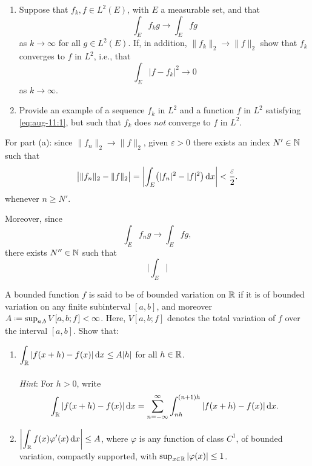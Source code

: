 \begin{problem}
  \hfill
  \begin{enumerate}[label=(\alph*),noitemsep]
  \item Suppose that \(f_k,f\in L^2(E)\), with \(E\) a measurable set, and
    that
    \[
      \label{eq:aug-11:1}
      \tag{\(\bigstar\)}
      \int_E f_kg\longrightarrow\int_E fg
    \]
    as \(k\to\infty\) for all \(g\in L^2(E)\). If, in addition,
    \(\|f_k\|_2\to\|f\|_2\) show that \(f_k\) converges to \(f\) in
    \(L^2\), i.e., that
    \[
      \int_E|f-f_k|^2\longrightarrow 0
    \]
    as \(k\to\infty\).
  \item Provide an example of a sequence \(f_k\) in \(L^2\) and a function
    \(f\) in \(L^2\) satisfying \eqref{eq:aug-11:1}, but such that \(f_k\)
    does \emph{not} converge to \(f\) in \(L^2\).
  \end{enumerate}
\end{problem}
\begin{solution}
  For part (a): since \(\|f_n\|_2\to\|f\|_2\), given \(\varepsilon>0\)
  there exists an index \(N'\in\mathbb{N}\) such that
  \[
    \bigl|
    \|f_n\|_2-\|f\|_2
    \bigr|
    =
    \biggl|
    \int_E\bigl(|f_n|^2-|f|^2\bigr)\mathop{}\!\mathrm{d} x
    \biggr|
    <\frac{\varepsilon}{2}.
  \]
  whenever \(n\geq N'\).

  Moreover, since
  \[
    \int_E f_ng\longrightarrow\int_E fg,
  \]
  there exists \(N''\in\mathbb{N}\) such that
  \[
    \biggl|
    \int_E
    \biggr|
  \]
\end{solution}

\begin{problem}
  A bounded function \(f\) is said to be of bounded variation on \(\mathbb{R}\)
  if it is of bounded variation on any finite subinterval \([a,b]\), and
  moreover \(A\defeq\sup_{a,b}V[a,b;f]<\infty\). Here, \(V[a,b;f]\) denotes the
  total variation of \(f\) over the interval \([a,b]\). Show that:
\begin{enumerate}[label=(\alph*),noitemsep]
\item \(\displaystyle\int_{\mathbb{R}}|f(x+h)-f(x)|\mathop{}\!\mathrm{d} x\leq A|h|\) for all
  \(h\in\mathbb{R}\).
  \\\\
  \emph{Hint}: For \(h>0\), write
\[
\int_{\mathbb{R}} |f(x+h)-f(x)|\mathop{}\!\mathrm{d} x=
\sum_{n=-\infty}^\infty\int_{nh}^{(n+1)h}|f(x+h)-f(x)|\mathop{}\!\mathrm{d} x.
\]
\item
  \(\displaystyle\left|\int_{\mathbb{R}} f(x)\varphi'(x)\mathop{}\!\mathrm{d} x\right|\leq A\),
  where \(\varphi\) is any function of class \(C^1\), of bounded variation,
  compactly supported, with \(\sup_{x\in\mathbb{R}}|\varphi(x)|\leq 1\).
\end{enumerate}
\end{problem}
\begin{solution}
\end{solution}

